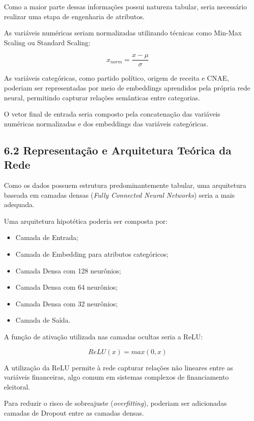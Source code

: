 \documentclass[11pt]{article}
\providecommand{\tightlist}{%
      \setlength{\itemsep}{0pt}\setlength{\parskip}{0pt}}
\begin{document}
Como a maior parte dessas informações possui natureza tabular, seria
necessário realizar uma etapa de engenharia de atributos.

As variáveis numéricas seriam normalizadas utilizando técnicas como
Min-Max Scaling ou Standard Scaling:

\[
x_{norm}=\frac{x-\mu}{\sigma}
\]

As variáveis categóricas, como partido político, origem de receita e
CNAE, poderiam ser representadas por meio de embeddings aprendidos pela
própria rede neural, permitindo capturar relações semânticas entre
categorias.

O vetor final de entrada seria composto pela concatenação das variáveis
numéricas normalizadas e dos embeddings das variáveis categóricas.

\subsection{6.2 Representação e Arquitetura Teórica da
Rede}\label{representauxe7uxe3o-e-arquitetura-teuxf3rica-da-rede}

Como os dados possuem estrutura predominantemente tabular, uma
arquitetura baseada em camadas densas (\emph{Fully Connected Neural
Networks}) seria a mais adequada.

Uma arquitetura hipotética poderia ser composta por:

\begin{itemize}
\tightlist
\item
  Camada de Entrada;
\item
  Camada de Embedding para atributos categóricos;
\item
  Camada Densa com 128 neurônios;
\item
  Camada Densa com 64 neurônios;
\item
  Camada Densa com 32 neurônios;
\item
  Camada de Saída.
\end{itemize}

A função de ativação utilizada nas camadas ocultas seria a ReLU:

\[
ReLU(x)=max(0,x)
\]

A utilização da ReLU permite à rede capturar relações não lineares entre
as variáveis financeiras, algo comum em sistemas complexos de
financiamento eleitoral.

Para reduzir o risco de sobreajuste (\emph{overfitting}), poderiam ser
adicionadas camadas de Dropout entre as camadas densas.
\end{document}
